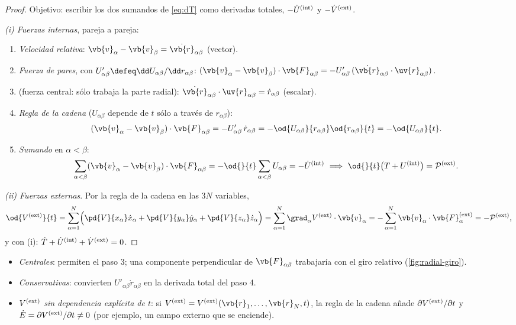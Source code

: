 \begin{proof}
Objetivo: escribir los dos sumandos de \eqref{eq:dT} como derivadas totales,
$-\dot U^{(\mathrm{int})}$ y $-\dot V^{(\mathrm{ext})}$.

\noindent\emph{(i) Fuerzas internas}, pareja a pareja:
\begin{enumerate}
  \item \emph{Velocidad relativa}: $\vb{v}_{\alpha}-\vb{v}_{\beta}=\dot{\vb{r}}_{\alpha\beta}$ (vector).
  \item \emph{Fuerza de pares}, con $U'_{\alpha\beta}\defeq\dd U_{\alpha\beta}/\dd r_{\alpha\beta}$:
  $(\vb{v}_{\alpha}-\vb{v}_{\beta})\cdot\vb{F}_{\alpha\beta}=-U'_{\alpha\beta}\,(\dot{\vb{r}}_{\alpha\beta}\cdot\uv{r}_{\alpha\beta})$.
  \item \emph{} (fuerza central: sólo trabaja la parte radial):
  $\dot{\vb{r}}_{\alpha\beta}\cdot\uv{r}_{\alpha\beta}=\dot r_{\alpha\beta}$ (escalar).
  \item \emph{Regla de la cadena} ($U_{\alpha\beta}$ depende de $t$ sólo a través de $r_{\alpha\beta}$):
  \[
    (\vb{v}_{\alpha}-\vb{v}_{\beta})\cdot\vb{F}_{\alpha\beta}=-U'_{\alpha\beta}\,\dot r_{\alpha\beta}
    =-\od{U_{\alpha\beta}}{r_{\alpha\beta}}\od{r_{\alpha\beta}}{t}=-\od{U_{\alpha\beta}}{t}.
  \]
  \item \emph{Sumando} en $\alpha<\beta$:
  \[
    \sab(\vb{v}_{\alpha}-\vb{v}_{\beta})\cdot\vb{F}_{\alpha\beta}=-\od{}{t}\sab U_{\alpha\beta}=-\dot U\inn
    \ \Longrightarrow\ \od{}{t}\bigl(T+U\inn\bigr)=\mathcal{P}\ext .
  \]
\end{enumerate}
\emph{(ii) Fuerzas externas}. Por la regla de la cadena en las $3N$ variables,
\[
  \od{V\ext}{t}=\sa\Bigl(\pd{V}{x_{\alpha}}\dot x_{\alpha}+\pd{V}{y_{\alpha}}\dot y_{\alpha}+\pd{V}{z_{\alpha}}\dot z_{\alpha}\Bigr)
  =\sa\grad_{\alpha}V\ext\cdot\vb{v}_{\alpha}=-\sa\vb{v}_{\alpha}\cdot\vb{F}_{\alpha}\ext=-\mathcal{P}\ext ,
\]
y con (i): $\dot T+\dot U^{(\mathrm{int})}+\dot V^{(\mathrm{ext})}=0$.
\end{proof}

\begin{observacion}
\begin{itemize}
  \item \emph{Centrales}: permiten el paso 3; una componente perpendicular de
        $\vb{F}_{\alpha\beta}$ trabajaría con el giro relativo (\cref{fig:radial-giro}).
  \item \emph{Conservativas}: convierten $U'_{\alpha\beta}\dot r_{\alpha\beta}$ en la derivada total del paso 4.
  \item \emph{$V^{(\mathrm{ext})}$ sin dependencia explícita de $t$}: si $V\ext=V\ext(\vb{r}_{1},\dots,\vb{r}_{N},t)$, la
        regla de la cadena añade $\partial V^{(\mathrm{ext})}/\partial t$ y $\dot E=\partial V^{(\mathrm{ext})}/\partial t\neq0$
        (por ejemplo, un campo externo que se enciende).
\end{itemize}
\end{observacion}

